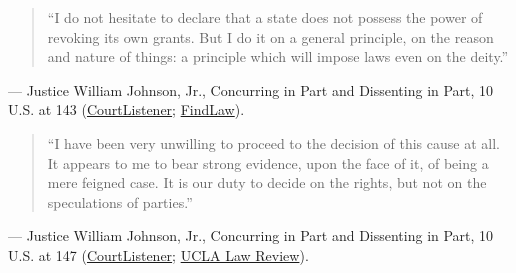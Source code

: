 \documentclass[12pt]{article}
\begin{document}
\begin{quote}
``I do not hesitate to declare that a state does not possess the power of revoking its own grants. But I do it on a general principle, on the reason and nature of things: a principle which will impose laws even on the deity.''
\end{quote}
\noindent --- Justice William Johnson, Jr., Concurring in Part and Dissenting in Part, 10 U.S. at 143 (\href{https://www.courtlistener.com/opinion/84935/fletcher-v-peck/}{CourtListener}; \href{https://caselaw.findlaw.com/court/us-supreme-court/10/87.html}{FindLaw}).

\begin{quote}
``I have been very unwilling to proceed to the decision of this cause at all. It appears to me to bear strong evidence, upon the face of it, of being a mere feigned case. It is our duty to decide on the rights, but not on the speculations of parties.''
\end{quote}
\noindent --- Justice William Johnson, Jr., Concurring in Part and Dissenting in Part, 10 U.S. at 147 (\href{https://www.courtlistener.com/opinion/84935/fletcher-v-peck/}{CourtListener}; \href{https://www.uclalawreview.org/wp-content/uploads/2019/09/12_52UCLALRev2892004-2005.pdf}{UCLA Law Review}).
\end{document}
